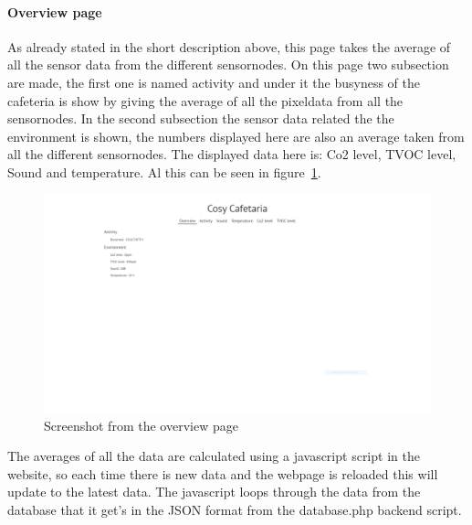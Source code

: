 \documentclass[11pt,a4paper]{article}
\begin{document}
\paragraph{Overview page}
As already stated in the short description above, this page takes the average of all the sensor data from the different sensornodes. 
On this page two subsection are made, the first one is named activity and under it the busyness of the cafeteria is show by giving the average of all the pixeldata from all the sensornodes.
In the second subsection the sensor data related the the environment is shown, the numbers displayed here are also an average taken from all the different sensornodes. 
The displayed data here is: Co2 level, TVOC level, Sound and temperature. Al this can be seen in figure~\ref{fig:overview_page}. 
\begin{figure}[H]
	\centering
	\includegraphics[width=1.0\linewidth]{overviewPage.png}
	\caption{Screenshot from the overview page}
	\label{fig:overview_page}
\end{figure}
The averages of all the data are calculated using a javascript script in the website, so each time there is new data and the webpage is reloaded this will update to the latest data.
The javascript loops through the data from the database that it get's in the JSON format from the database.php backend script.
\end{document}
